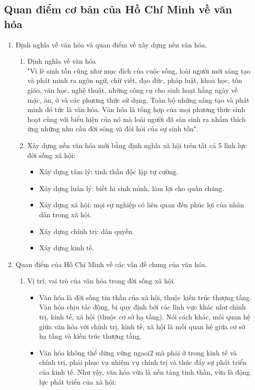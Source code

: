 \documentclass{article}
\begin{document}
	\subsection{Quan điểm cơ bản của Hồ Chí Minh về văn hóa}
	\begin{enumerate}
		\item Định nghĩa về văn hóa và quan điểm về xây dựng nên văn hóa.
		\begin{enumerate}
			\item Định nghĩa về văn hóa\\
			"Vì lẽ sinh tồn cũng như mục đích của cuộc sống, loài người mới sáng tạo và phát minh ra ngôn ngữ, chữ viết, đạo đức, pháp luật, khoa học, tôn giáo, văn học, nghệ thuật, những công cụ cho sinh hoạt hằng ngày về mặc, ăn, ở và các phương thức sử dụng. Toàn bộ những sáng tạo và phát minh đó tức là văn hóa. Văn hóa là tổng hợp của mọi phương thức sinh hoạt cùng với biểu hiện của nó mà loài người đã sản sinh ra nhắm thích ứng những nhu cầu đời sông và đòi hỏi của sự sinh tồn".
			\item Xây dựng nền văn hóa mới bằng định nghĩa xã hội trên tất cả 5 lĩnh lực đời sống xã hội:
			\begin{itemize}
				\item Xây dựng tâm lý: tinh thần độc lập tự cường.
				\item Xây dựng luân lý: biết hi sinh mình, làm lợi cho quần chúng.
				\item Xây dựng xã hội: mọi sự nghiệp có liên quan đến phúc lợi của nhân dân trong xã hội.
				\item Xây dựng chính trị: dân quyền.
				\item Xây dựng kinh tế.
			\end{itemize}
		\end{enumerate}
		\item Quan điểm của Hồ Chí Minh về các vấn đề chung của văn hóa.
		\begin{enumerate}
			\item Vị trí, vai trò của văn hóa trong đời sống xã hội.
			\begin{itemize}
				\item Văn hóa là đời sống tin thần của xã hội, thuộc kiến trúc thượng tầng.\\
				Văn hóa chịu tác động, bị quy định bởi các lĩnh vực khác như chính trị, kinh tế, xã hội (thuộc cơ sở hạ tầng). Nói cách khác, mối quan hệ giữa văn hóa với chính trị, kinh tế, xã hội là mối quan hệ giữa cơ sở hạ tầng và kiến trúc thượng tầng.
				\item Văn hóa không thể dứng vững ngaoi2 mà phải ở trong kinh tế và chính trị, phải phục vụ nhiệm vụ chính trị và thúc đẩy sự phát triển của kinh tế. Như vậy, văn hóa vừa là nền tảng tinh thần, vừa là động lực phát triển của xã hội:

\end{itemize}
\end{enumerate}
\end{enumerate}
\end{document}
